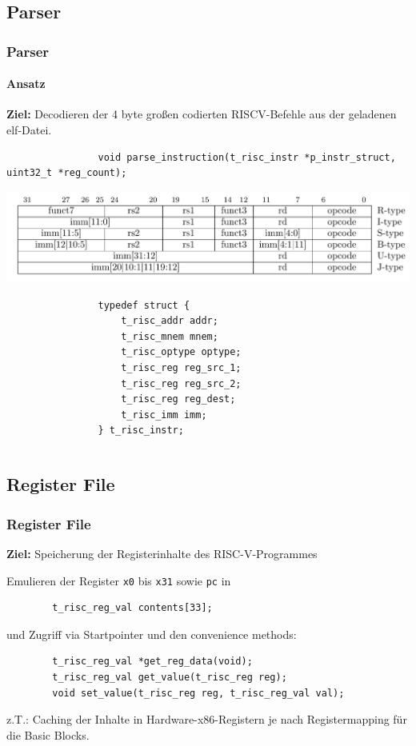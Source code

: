\documentclass[german]{tum-presentation}
\begin{document}
\subsection{Parser} %
\begin{frame}[fragile]
	\frametitle{Parser}
	\framesubtitle{Ansatz}
	\textbf{Ziel:} Decodieren der 4 byte großen codierten RISCV-Befehle aus der geladenen elf-Datei.


	\begin{lstlisting}
				void parse_instruction(t_risc_instr *p_instr_struct, uint32_t *reg_count);
	\end{lstlisting}
	\pause
	\includegraphics[width=\textwidth]{diagrams/optypes}
	\begin{lstlisting}
				typedef struct {
				    t_risc_addr addr;
				    t_risc_mnem mnem;
				    t_risc_optype optype;
				    t_risc_reg reg_src_1;
				    t_risc_reg reg_src_2;
				    t_risc_reg reg_dest;
				    t_risc_imm imm;
				} t_risc_instr;
	\end{lstlisting}
	\begin{columns}
		\begin{column}{0.5\textwidth}
		\end{column}
		\begin{column}{0.5\textwidth}

		\end{column}
	\end{columns}
\end{frame}

\subsection{Register File} %
\begin{frame}[fragile]
	\frametitle{Register File}
	\textbf{Ziel:} Speicherung der Registerinhalte des RISC-V-Programmes
	
	\vspace{1cm}
	\pause
	Emulieren der Register \verb!x0! bis \verb!x31! sowie \verb!pc! in
	\begin{lstlisting}
		t_risc_reg_val contents[33];
	\end{lstlisting}
	
	\pause
	und Zugriff via Startpointer und den convenience methods:
	
	\begin{lstlisting}
		t_risc_reg_val *get_reg_data(void);
		t_risc_reg_val get_value(t_risc_reg reg);
		void set_value(t_risc_reg reg, t_risc_reg_val val);
	\end{lstlisting}
	
	z.T.: Caching der Inhalte in Hardware-x86-Registern je nach Registermapping für die Basic Blocks.
\end{frame}
\end{document}
